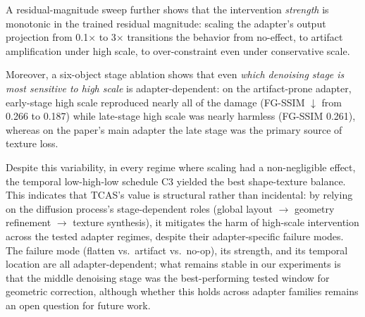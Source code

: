 \documentclass[times,twocolumn,final]{elsarticle}
\begin{document}
A residual-magnitude sweep further shows that the intervention \emph{strength} is monotonic in the trained residual magnitude: scaling the adapter's output projection from 0.1$\times$ to 3$\times$ transitions the behavior from no-effect, to artifact amplification under high scale, to over-constraint even under conservative scale.

Moreover, a six-object stage ablation shows that even \emph{which denoising stage is most sensitive to high scale} is adapter-dependent: on the artifact-prone adapter, early-stage high scale reproduced nearly all of the damage (FG-SSIM $\downarrow$ from 0.266 to 0.187) while late-stage high scale was nearly harmless (FG-SSIM 0.261), whereas on the paper's main adapter the late stage was the primary source of texture loss.

Despite this variability, in every regime where scaling had a non-negligible effect, the temporal low-high-low schedule C3 yielded the best shape-texture balance. This indicates that TCAS's value is structural rather than incidental: by relying on the diffusion process's stage-dependent roles (global layout $\to$ geometry refinement $\to$ texture synthesis), it mitigates the harm of high-scale intervention across the tested adapter regimes, despite their adapter-specific failure modes. The failure mode (flatten vs.\ artifact vs.\ no-op), its strength, and its temporal location are all adapter-dependent; what remains stable in our experiments is that the middle denoising stage was the best-performing tested window for geometric correction, although whether this holds across adapter families remains an open question for future work.
\end{document}
